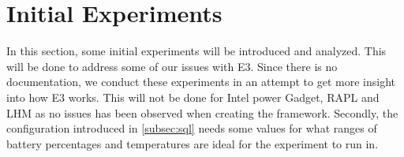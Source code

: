 \section{Initial Experiments}\label{sec:initial_experiments}

In this section, some initial experiments will be introduced and analyzed. This will be done to address some of our issues with E3. Since there is no documentation, we conduct these experiments in an attempt to get more insight into how E3 works. This will not be done for Intel power Gadget, RAPL and LHM as no issues has been observed when creating the framework. Secondly, the configuration introduced in \cref{subsec:sql} needs some values for what ranges of battery percentages and temperatures are ideal for the experiment to run in.







% 


